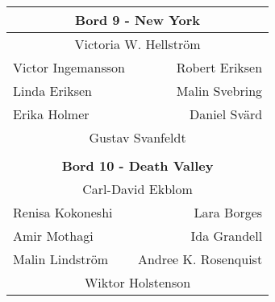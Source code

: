 \documentclass[a5paper]{article}
\begin{document}
\begin{landscape}
\begin{center}
\begin{tabular}{  l r }
		\multicolumn{2}{c}{\textbf{		Bord 9 - New York	}} \\ \hline
		\multicolumn{2}{c}{	Victoria W. Hellström		}   \\
		Victor Ingemansson	&	Robert Eriksen	\\
		Linda Eriksen	&	Malin Svebring	\\
		Erika Holmer	&	Daniel Svärd	\\
		\multicolumn{2}{c}{	Gustav Svanfeldt		}   \\
		\\
		
		\multicolumn{2}{c}{\textbf{		Bord 10 - Death Valley	}} \\ \hline
		\multicolumn{2}{c}{	Carl-David Ekblom		}   \\
		Renisa Kokoneshi	&	Lara Borges	\\
		Amir Mothagi	&	Ida Grandell	\\
		Malin Lindström	&	Andree K. Rosenquist	\\
		\multicolumn{2}{c}{	Wiktor Holstenson		}   \\
		
	\end{tabular}			
\end{center}																										

	\end{landscape}
	\endgroup
	
	
	
\end{document}
